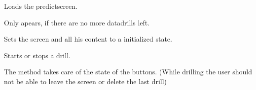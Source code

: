 \documentclass[letterpaper,10pt,english]{sphinxmanual}
\begin{document}
\begin{fulllineitems}
\begin{fulllineitems}
\end{fulllineitems}


\begin{fulllineitems}
\label{\detokenize{anoog.automation:anoog.automation.graphical_user_interface.Train_Window.event_predict_button}}
\sphinxAtStartPar
Loads the predict\sphinxhyphen{}screen.

\sphinxAtStartPar
Only apears, if there are no more data\sphinxhyphen{}drills left.

\end{fulllineitems}


\begin{fulllineitems}
\label{\detokenize{anoog.automation:anoog.automation.graphical_user_interface.Train_Window.event_reset_button}}
\sphinxAtStartPar
Sets the screen and all his content to a initialized state.

\end{fulllineitems}


\begin{fulllineitems}
\label{\detokenize{anoog.automation:anoog.automation.graphical_user_interface.Train_Window.event_start_button}}
\sphinxAtStartPar
Starts or stops a drill.

\sphinxAtStartPar
The method takes care of the state of the buttons. (While drilling the user should not be able to leave the screen or delete the last drill)

\end{fulllineitems}



\end{fulllineitems}
\end{document}
